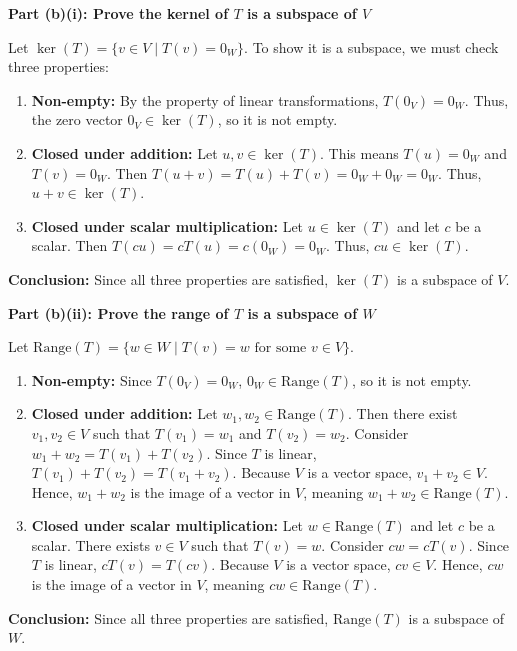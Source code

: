 \documentclass[12pt,a3paper]{article}
\begin{document}
\begin{tcolorbox}[enhanced,breakable,colback=cF!4,colframe=cF,
  boxrule=0.8pt,arc=5pt,
  title={\textbf{Answer}},
  fonttitle=\bfseries\color{white},colbacktitle=cF]
\vspace{0.3cm}
\hrulefill
\vspace{0.3cm}

\textbf{Part (b)(i): Prove the kernel of $T$ is a subspace of $V$}

Let $\ker(T) = \{v \in V \mid T(v) = 0_W\}$. To show it is a subspace, we must check three properties:
\begin{enumerate}
    \item \textbf{Non-empty:} By the property of linear transformations, $T(0_V) = 0_W$. Thus, the zero vector $0_V \in \ker(T)$, so it is not empty.
    \item \textbf{Closed under addition:} Let $u, v \in \ker(T)$. This means $T(u) = 0_W$ and $T(v) = 0_W$. 
    Then $T(u + v) = T(u) + T(v) = 0_W + 0_W = 0_W$. Thus, $u + v \in \ker(T)$.
    \item \textbf{Closed under scalar multiplication:} Let $u \in \ker(T)$ and let $c$ be a scalar. 
    Then $T(cu) = c T(u) = c(0_W) = 0_W$. Thus, $cu \in \ker(T)$.
\end{enumerate}
\textbf{Conclusion:} Since all three properties are satisfied, $\ker(T)$ is a subspace of $V$.

\medskip
\textbf{Part (b)(ii): Prove the range of $T$ is a subspace of $W$}

Let $\text{Range}(T) = \{w \in W \mid T(v) = w \text{ for some } v \in V\}$.
\begin{enumerate}
    \item \textbf{Non-empty:} Since $T(0_V) = 0_W$, $0_W \in \text{Range}(T)$, so it is not empty.
    \item \textbf{Closed under addition:} Let $w_1, w_2 \in \text{Range}(T)$. Then there exist $v_1, v_2 \in V$ such that $T(v_1) = w_1$ and $T(v_2) = w_2$. 
    Consider $w_1 + w_2 = T(v_1) + T(v_2)$. Since $T$ is linear, $T(v_1) + T(v_2) = T(v_1 + v_2)$. 
    Because $V$ is a vector space, $v_1 + v_2 \in V$. Hence, $w_1 + w_2$ is the image of a vector in $V$, meaning $w_1 + w_2 \in \text{Range}(T)$.
    \item \textbf{Closed under scalar multiplication:} Let $w \in \text{Range}(T)$ and let $c$ be a scalar. There exists $v \in V$ such that $T(v) = w$.
    Consider $cw = c T(v)$. Since $T$ is linear, $c T(v) = T(cv)$. 
    Because $V$ is a vector space, $cv \in V$. Hence, $cw$ is the image of a vector in $V$, meaning $cw \in \text{Range}(T)$.
\end{enumerate}
\textbf{Conclusion:} Since all three properties are satisfied, $\text{Range}(T)$ is a subspace of $W$.

\end{tcolorbox}
\end{document}
